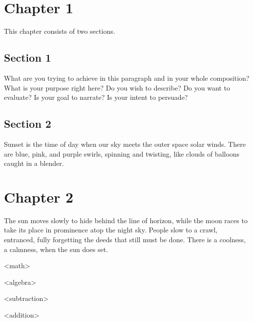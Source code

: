 \chapter{Chapter 1}
\label{chapter:1}
This chapter consists of two sections.

\section{Section 1}
\label{section:1}

What are you trying to achieve in this paragraph and in your whole composition? What is your purpose right here? Do you wish to describe? Do you want to evaluate? Is your goal to narrate? Is your intent to persuade?

\section{Section 2}
\label{section:2}

Sunset is the time of day when our sky meets the outer space solar winds. There are blue, pink, and purple swirls, spinning and twisting, like clouds of balloons caught in a blender.


\chapter{Chapter 2}
The sun moves slowly to hide behind the line of horizon, while the moon races to take its place in prominence atop the night sky. People slow to a crawl, entranced, fully forgetting the deeds that still must be done. There is a coolness, a calmness, when the sun does set.

\begin{concepthierarchy}
    \begin{concept}<math>
        \begin{concept}<algebra>
        \end{concept}
        \begin{concept}<subtraction>
        \end{concept}
    \end{concept}
    \begin{concept}<addition>
    \end{concept}
\end{concepthierarchy}
